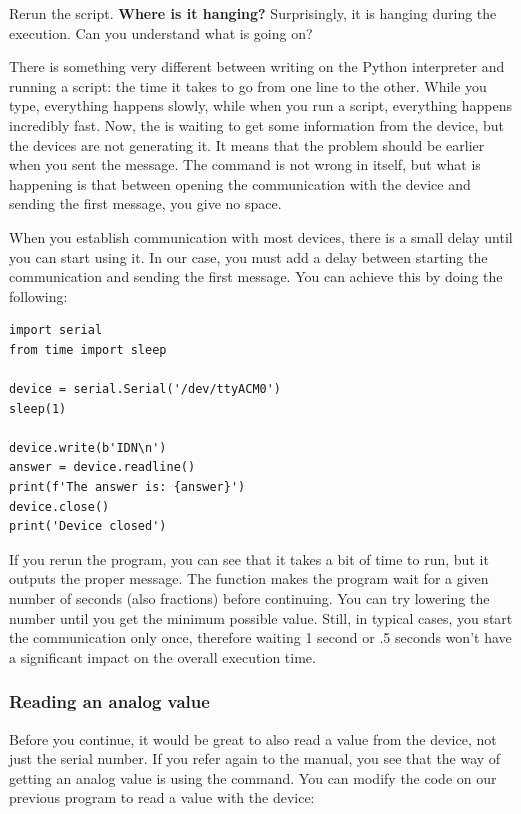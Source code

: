Rerun the script. \textbf{Where is it hanging?} Surprisingly, it is hanging during the  execution. Can you understand what is going on?

There is something very different between writing on the Python interpreter and running a script: the time it takes to go from one line to the other. While you type, everything happens slowly, while when you run a script, everything happens incredibly fast. Now, the  is waiting to get some information from the device, but the devices are not generating it. It means that the problem should be earlier when you sent the  message. The command is not wrong in itself, but what is happening is that between opening the communication with the device and sending the first message, you give no space.

When you establish communication with most devices, there is a small delay until you can start using it. In our case, you must add a delay between starting the communication and sending the first message. You can achieve this by doing the following:

\begin{verbatim}
import serial
from time import sleep

device = serial.Serial('/dev/ttyACM0')
sleep(1)

device.write(b'IDN\n')
answer = device.readline()
print(f'The answer is: {answer}')
device.close()
print('Device closed')
\end{verbatim}

If you rerun the program, you can see that it takes a bit of time to run, but it outputs the proper message. The  function makes the program wait for a given number of seconds (also fractions) before continuing. You can try lowering the number until you get the minimum possible value. Still, in typical cases, you start the communication only once, therefore waiting 1 second or .5 seconds won't have a significant impact on the overall execution time.

\subsubsection{Reading an analog value}
Before you continue, it would be great to also read a value from the device, not just the serial number. If you refer again to the manual, you see that the way of getting an analog value is using the  command. You can modify the code on our previous program to read a value with the device:


